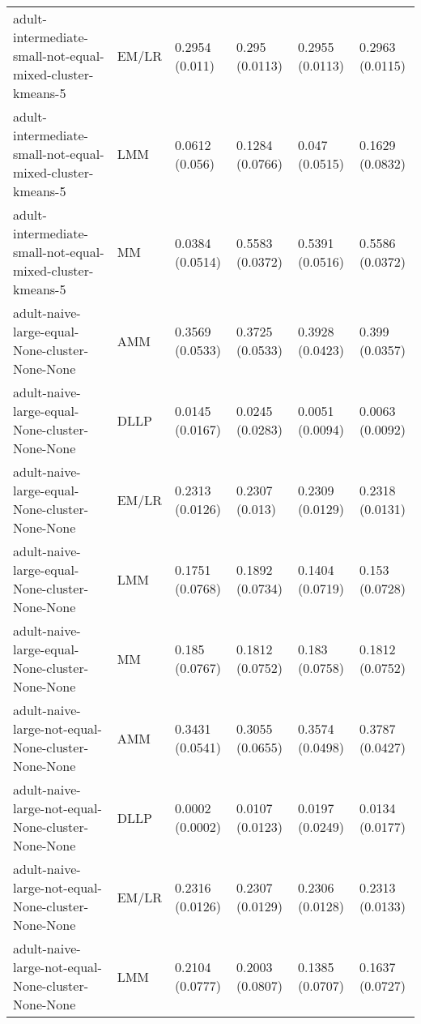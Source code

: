 \begin{longtable}{llllll}
                              adult-intermediate-small-not-equal-mixed-cluster-kmeans-5 &     EM/LR &  0.2954 (0.011) &   0.295 (0.0113) &   0.2955 (0.0113) &     0.2963 (0.0115) \\
                              adult-intermediate-small-not-equal-mixed-cluster-kmeans-5 &       LMM &  0.0612 (0.056) &  0.1284 (0.0766) &    0.047 (0.0515) &     0.1629 (0.0832) \\
                              adult-intermediate-small-not-equal-mixed-cluster-kmeans-5 &        MM & 0.0384 (0.0514) &  0.5583 (0.0372) &   0.5391 (0.0516) &     0.5586 (0.0372) \\
                                         adult-naive-large-equal-None-cluster-None-None &       AMM & 0.3569 (0.0533) &  0.3725 (0.0533) &   0.3928 (0.0423) &      0.399 (0.0357) \\
                                         adult-naive-large-equal-None-cluster-None-None &      DLLP & 0.0145 (0.0167) &  0.0245 (0.0283) &   0.0051 (0.0094) &     0.0063 (0.0092) \\
                                         adult-naive-large-equal-None-cluster-None-None &     EM/LR & 0.2313 (0.0126) &   0.2307 (0.013) &   0.2309 (0.0129) &     0.2318 (0.0131) \\
                                         adult-naive-large-equal-None-cluster-None-None &       LMM & 0.1751 (0.0768) &  0.1892 (0.0734) &   0.1404 (0.0719) &      0.153 (0.0728) \\
                                         adult-naive-large-equal-None-cluster-None-None &        MM &  0.185 (0.0767) &  0.1812 (0.0752) &    0.183 (0.0758) &     0.1812 (0.0752) \\
                                     adult-naive-large-not-equal-None-cluster-None-None &       AMM & 0.3431 (0.0541) &  0.3055 (0.0655) &   0.3574 (0.0498) &     0.3787 (0.0427) \\
                                     adult-naive-large-not-equal-None-cluster-None-None &      DLLP & 0.0002 (0.0002) &  0.0107 (0.0123) &   0.0197 (0.0249) &     0.0134 (0.0177) \\
                                     adult-naive-large-not-equal-None-cluster-None-None &     EM/LR & 0.2316 (0.0126) &  0.2307 (0.0129) &   0.2306 (0.0128) &     0.2313 (0.0133) \\
                                     adult-naive-large-not-equal-None-cluster-None-None &       LMM & 0.2104 (0.0777) &  0.2003 (0.0807) &   0.1385 (0.0707) &     0.1637 (0.0727) \\

\end{longtable}

